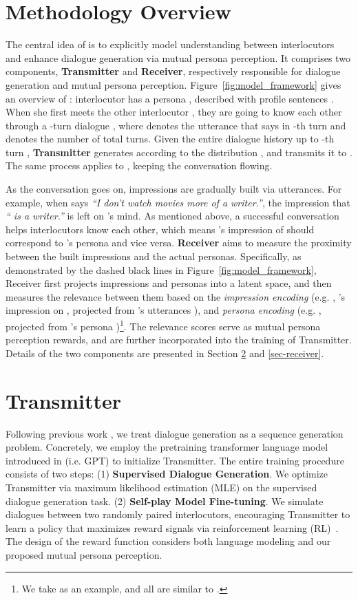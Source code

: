 \documentclass[11pt,a4paper]{article}
\begin{document}
\section{Methodology Overview}

The central idea of  is to explicitly model understanding between interlocutors and enhance dialogue generation via mutual persona perception. It comprises two components, \textbf{Transmitter} and \textbf{Receiver}, respectively responsible for dialogue generation and mutual persona perception. Figure~\ref{fig:model_framework} gives an overview of : interlocutor  has a persona , described with  profile sentences . When she first meets the other interlocutor , they are going to know each other through a -turn dialogue , where  denotes the utterance that  says in -th turn and  denotes the number of total turns. Given the entire dialogue history up to -th turn , \textbf{Transmitter} generates  according to the distribution , and transmits it to . The same process applies to , keeping the conversation flowing.


As the conversation goes on, impressions are gradually built via utterances. 
For example, when  says \textit{``I don't watch movies more of a writer.''}, the impression that \textit{`` is a writer.''} is left on 's mind. 
As mentioned above, a successful conversation helps interlocutors know each other, 
which means 's impression of  should correspond to 's persona and vice versa. \textbf{Receiver} aims to measure the proximity between the built impressions and the actual personas. Specifically, as demonstrated by the dashed black lines in Figure~\ref{fig:model_framework}, Receiver first projects impressions and personas into a latent space, and then measures the relevance between them based on the \emph{impression encoding} (e.g. , 's impression on , projected from 's utterances ), and \emph{persona encoding} (e.g. , projected from 's persona )\footnote{We take  as an example, and all are similar to .}. The relevance scores serve as mutual persona perception rewards, and are further incorporated into the training of Transmitter. Details of the two components are presented in Section \ref{sec-transmitter} and \ref{sec-receiver}. 

\section{Transmitter}\label{sec-transmitter}

Following previous work \cite{li2016deep,zhang2018personalizing}, we treat dialogue generation as a sequence generation problem. Concretely, we employ the pretraining transformer language model introduced in \citet{Radford2018ImprovingLU} (i.e. GPT) to initialize Transmitter. The entire training procedure consists of two steps: (1) \textbf{Supervised Dialogue Generation}. We optimize Transmitter via maximum likelihood estimation (MLE) on the supervised dialogue generation task. (2) \textbf{Self-play Model Fine-tuning}. We simulate dialogues between two randomly paired interlocutors, encouraging Transmitter to learn a policy that maximizes reward signals via reinforcement learning (RL)~\cite{sutton2000policy}. The design of the reward function considers both language modeling and our proposed mutual persona perception.
\end{document}
